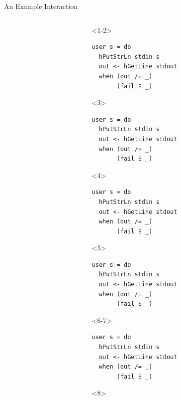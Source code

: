 \documentclass[aspectratio=169]{beamer}
\begin{document}
\begin{frame}[fragile]{An Example Interaction}
\begin{columns}[t]
\begin{column}{0.5\textwidth}
    \end{column}
    \begin{column}{0.5\textwidth}
\begin{onlyenv}<1-2>
\begin{verbatim}
user s = do
  hPutStrLn stdin s
  out <- hGetLine stdout
  when (out /= _)
       (fail $ _)
\end{verbatim}
\end{onlyenv}
\begin{onlyenv}<3>
\begin{verbatim}
user s = do
  hPutStrLn stdin s
  out <- hGetLine stdout
  when (out /= _)
       (fail $ _)
\end{verbatim}
\end{onlyenv}
\begin{onlyenv}<4>
\begin{verbatim}
user s = do
  hPutStrLn stdin s
  out <- hGetLine stdout
  when (out /= _)
       (fail $ _)
\end{verbatim}
\end{onlyenv}
\begin{onlyenv}<5>
\begin{verbatim}
user s = do
  hPutStrLn stdin s
  out <- hGetLine stdout
  when (out /= _)
       (fail $ _)
\end{verbatim}
\end{onlyenv}
\begin{onlyenv}<6-7>
\begin{verbatim}
user s = do
  hPutStrLn stdin s
  out <- hGetLine stdout
  when (out /= _)
       (fail $ _)
\end{verbatim}
\end{onlyenv}
\begin{onlyenv}<8>
\begin{verbatim}

\end{verbatim}
\end{onlyenv}
\end{column}
\end{columns}
\end{frame}
\end{document}
